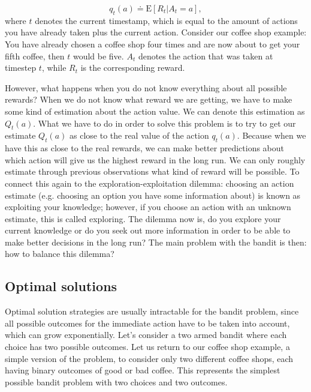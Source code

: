 \begin{equation}
    q_t(a) \doteq \mathrm{E} [R_t|A_t=a],
\end{equation}
 where $t$ denotes the current timestamp, which is equal to the amount of actions you have already taken plus the current action.
Consider our coffee shop example: You have already chosen a coffee shop four times and are now about to get your fifth coffee, then $t$ would be five. $A_t$ denotes the action that was taken at timestep $t$, while $R_t$ is the corresponding reward. 

However, what happens when you do not know everything about all possible rewards? When we do not know what reward we are getting, we have to make some kind of estimation about the action value. We can denote this estimation as $Q_t(a)$. What we have to do in order to solve this problem is to try to get our estimate $Q_t(a)$ as close to the real value of the action $q_t(a)$. Because when we have this as close to the real rewards, we can make better predictions about which action will give us the highest reward in the long run. 
We can only roughly estimate through previous observations what kind of reward will be possible.
To connect this again to the exploration-exploitation dilemma:
choosing an action estimate (e.g. choosing an option you have some information about) is known as exploiting your knowledge; however, if you choose an action with an unknown estimate, this is called exploring. The dilemma now is, do you explore your current knowledge or do you seek out more information in order to be able to make better decisions in the long run? 
The main problem with the bandit is then: how to balance this dilemma? 

\subsection{Optimal solutions}
Optimal solution strategies are usually intractable for the bandit problem, since all possible outcomes for the immediate action have to be taken into account, which can grow exponentially.
Let's consider a two armed bandit where each choice has two possible outcomes. %
Let us return to our coffee shop example, a simple version of the problem, to consider only two different coffee shops, each having binary outcomes of good or bad coffee. This represents the simplest possible bandit problem with two choices and two outcomes. 

